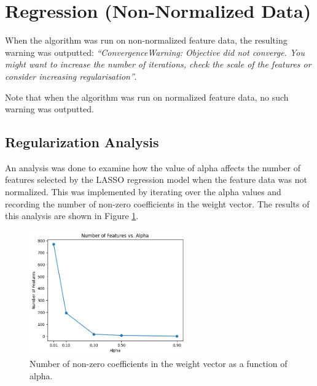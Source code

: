 \documentclass[11pt]{article}
\begin{document}

\section{Regression (Non-Normalized Data)}\label{app:B}

When the algorithm was run on non-normalized feature data, the resulting warning was outputted: \textit{``ConvergenceWarning: Objective did not converge. You might want to increase the number of iterations, check the scale of the features or consider increasing regularisation''}. 

Note that when the algorithm was run on normalized feature data, no such warning was outputted.

\subsection*{Regularization Analysis}

An analysis was done to examine how the value of alpha affects the number of features selected by the LASSO regression model when the feature data was not normalized. This was implemented by iterating over the alpha values and recording the number of non-zero coefficients in the weight vector. The results of this analysis are shown in Figure \ref{fig:no_normal_lasso_alpha}.
\begin{figure}[H]
    \centering
    \includegraphics[width=0.6\textwidth]{Images/no normal regularization.png}
    \caption{Number of non-zero coefficients in the weight vector as a function of alpha.}
    \label{fig:no_normal_lasso_alpha}
\end{figure}
\end{document}
